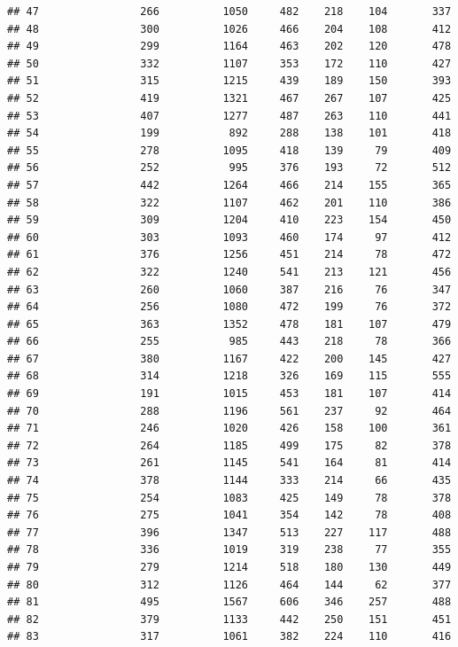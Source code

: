 \documentclass[]{book}
\begin{document}
\begin{verbatim}
## 47                266          1050     482    218    104       337
## 48                300          1026     466    204    108       412
## 49                299          1164     463    202    120       478
## 50                332          1107     353    172    110       427
## 51                315          1215     439    189    150       393
## 52                419          1321     467    267    107       425
## 53                407          1277     487    263    110       441
## 54                199           892     288    138    101       418
## 55                278          1095     418    139     79       409
## 56                252           995     376    193     72       512
## 57                442          1264     466    214    155       365
## 58                322          1107     462    201    110       386
## 59                309          1204     410    223    154       450
## 60                303          1093     460    174     97       412
## 61                376          1256     451    214     78       472
## 62                322          1240     541    213    121       456
## 63                260          1060     387    216     76       347
## 64                256          1080     472    199     76       372
## 65                363          1352     478    181    107       479
## 66                255           985     443    218     78       366
## 67                380          1167     422    200    145       427
## 68                314          1218     326    169    115       555
## 69                191          1015     453    181    107       414
## 70                288          1196     561    237     92       464
## 71                246          1020     426    158    100       361
## 72                264          1185     499    175     82       378
## 73                261          1145     541    164     81       414
## 74                378          1144     333    214     66       435
## 75                254          1083     425    149     78       378
## 76                275          1041     354    142     78       408
## 77                396          1347     513    227    117       488
## 78                336          1019     319    238     77       355
## 79                279          1214     518    180    130       449
## 80                312          1126     464    144     62       377
## 81                495          1567     606    346    257       488
## 82                379          1133     442    250    151       451
## 83                317          1061     382    224    110       416

\end{verbatim}
\end{document}
